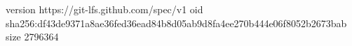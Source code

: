 version https://git-lfs.github.com/spec/v1
oid sha256:df43de9371a8ae36fed36ead84b8d05ab9d8fa4ee270b444e06f8052b2673bab
size 2796364
